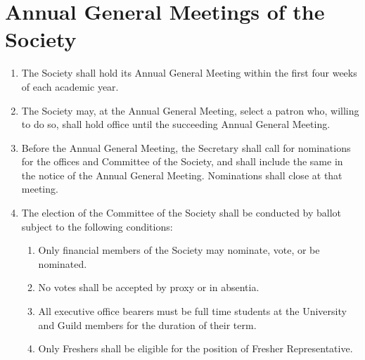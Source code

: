 \documentclass[a4paper]{article}
\begin{document}
\section{Annual General Meetings of the Society} \label{sec:AGMs}
\begin{enumerate}
    \item The Society shall hold its Annual General Meeting within the first four weeks of each academic year.
    \item The Society may, at the Annual General Meeting, select a patron who, willing to do so, shall hold office until the succeeding Annual General Meeting.
    \item Before the Annual General Meeting, the Secretary shall call for nominations for the offices and Committee of the Society, and shall include the same in the notice of the Annual General Meeting. Nominations shall close at that meeting.
    \item The election of the Committee of the Society shall be conducted by ballot subject to the following conditions:
    \begin{enumerate}
        \item Only financial members of the Society may nominate, vote, or be nominated.
        \item No votes shall be accepted by proxy or in absentia.
        \item All executive office bearers must be full time students at the University and Guild members for the duration of their term.
        \item \label{fresher_rep_requirement} Only Freshers shall be eligible for the position of Fresher Representative.
    \end{enumerate}
\end{enumerate}
\end{document}
